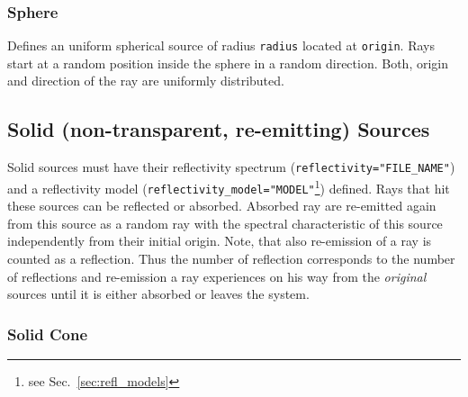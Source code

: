 \documentclass[10pt,a4paper,titlepage]{article}
\begin{document}
\subsubsection{Sphere}







\vspace{0.25cm}

Defines an uniform spherical source of radius {\tt radius} located at {\tt origin}. Rays start at a random position inside the sphere in a random direction. Both, origin and direction of the ray are uniformly distributed.

\subsection{Solid (non-transparent, re-emitting) Sources}

Solid sources must have their reflectivity spectrum ({\tt reflectivity="FILE\_NAME"}) and a reflectivity model ({\tt reflectivity\_model="MODEL"}\footnote{see Sec.~\ref{sec:refl_models}}) defined. Rays that hit these sources can be reflected or absorbed. Absorbed ray are re-emitted again from this source as a random ray with the spectral characteristic of this source independently from their initial origin. Note, that also re-emission of a ray is counted as a reflection. Thus the number of reflection corresponds to the number of reflections and re-emission a ray experiences on his way from the \emph{original} sources until it is either absorbed or leaves the system.

\subsubsection{Solid Cone}






\end{document}
